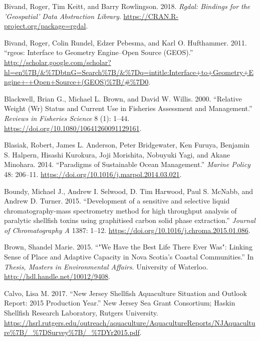 \documentclass[
]{book}
\newlength{\cslhangindent}
\newenvironment{cslreferences}%
  {\setlength{\parindent}{0pt}%
  \everypar{\setlength{\hangindent}{\cslhangindent}}\ignorespaces}%
  {\par}
\begin{document}
\begin{cslreferences}
\leavevmode\hypertarget{ref-rgdal}{}%
Bivand, Roger, Tim Keitt, and Barry Rowlingson. 2018. \emph{Rgdal: Bindings for the 'Geospatial' Data Abstraction Library}. \url{https://CRAN.R-project.org/package=rgdal}.

\leavevmode\hypertarget{ref-Bivand2011}{}%
Bivand, Roger, Colin Rundel, Edzer Pebesma, and Karl O. Hufthammer. 2011. ``rgeos: Interface to Geometry Engine--Open Source (GEOS).'' \url{http://scholar.google.com/scholar?hl=en\%7B/\&\%7DbtnG=Search\%7B/\&\%7Dq=intitle:Interface+to+Geometry+Engine+-+Open+Source+(GEOS)\%7B/\#\%7D0}.

\leavevmode\hypertarget{ref-Blackwell2000}{}%
Blackwell, Brian G., Michael L. Brown, and David W. Willis. 2000. ``Relative Weight (Wr) Status and Current Use in Fisheries Assessment and Management.'' \emph{Reviews in Fisheries Science} 8 (1): 1--44. \url{https://doi.org/10.1080/10641260091129161}.

\leavevmode\hypertarget{ref-blasiak_paradigms_2014}{}%
Blasiak, Robert, James L. Anderson, Peter Bridgewater, Ken Furuya, Benjamin S. Halpern, Hisashi Kurokura, Joji Morishita, Nobuyuki Yagi, and Akane Minohara. 2014. ``Paradigms of Sustainable Ocean Management.'' \emph{Marine Policy} 48: 206--11. \url{https://doi.org/10.1016/j.marpol.2014.03.021}.

\leavevmode\hypertarget{ref-Boundy2015}{}%
Boundy, Michael J., Andrew I. Selwood, D. Tim Harwood, Paul S. McNabb, and Andrew D. Turner. 2015. ``Development of a sensitive and selective liquid chromatography-mass spectrometry method for high throughput analysis of paralytic shellfish toxins using graphitised carbon solid phase extraction.'' \emph{Journal of Chromatography A} 1387: 1--12. \url{https://doi.org/10.1016/j.chroma.2015.01.086}.

\leavevmode\hypertarget{ref-brown_we_2015}{}%
Brown, Shandel Marie. 2015. ``"We Have the Best Life There Ever Was": Linking Sense of Place and Adaptive Capacity in Nova Scotia's Coastal Communities.'' In \emph{Thesis, Masters in Environmental Affairs}. University of Waterloo. \url{http://hdl.handle.net/10012/9408}.

\leavevmode\hypertarget{ref-Calvo2017}{}%
Calvo, Lisa M. 2017. ``New Jersey Shellfish Aquaculture Situation and Outlook Report: 2015 Production Year.'' New Jersey Sea Grant Consortium; Haskin Shellfish Research Laboratory, Rutgers University. \url{https://hsrl.rutgers.edu/outreach/aquaculture/AquacultureReports/NJAquaculture\%7B/_\%7DSurvey\%7B/_\%7DYr2015.pdf}.


\end{cslreferences}
\end{document}

